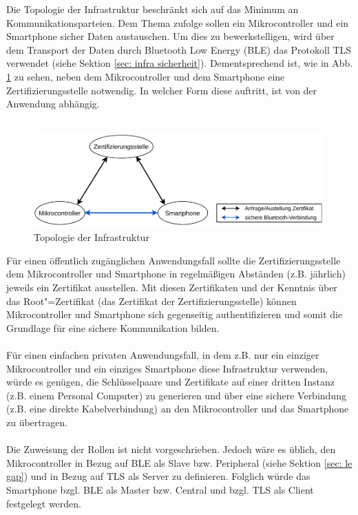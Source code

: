 Die Topologie der Infrastruktur beschränkt sich auf das Minimum an Kommunikationsparteien. Dem Thema zufolge sollen ein Mikrocontroller und ein Smartphone sicher Daten austauschen. Um dies zu bewerkstelligen, wird über dem Transport der Daten durch Bluetooth Low Energy (BLE) das Protokoll TLS verwendet (siehe Sektion \ref{sec: infra sicherheit}). Dementsprechend ist, wie in Abb. \ref{fig: infra topologie} zu sehen, neben dem Mikrocontroller und dem Smartphone eine Zertifizierungsstelle notwendig. In welcher Form diese auftritt, ist von der Anwendung abhängig.
\\\\

\begin{figure}[H]
    \centering
    \includegraphics[width=1\textwidth]{graphics/infra_topologie.pdf}
    \caption[Topologie der Infrastruktur]{Topologie der Infrastruktur}
    \label{fig: infra topologie}
\end{figure}

Für einen öffentlich zugänglichen Anwendungsfall sollte die Zertifizierungsstelle dem Mikrocontroller und Smartphone in regelmäßigen Abständen (z.B. jährlich) jeweils ein Zertifikat ausstellen. Mit diesen Zertifikaten und der Kenntnis über das Root"=Zertifikat (das Zertifikat der Zertifizierungsstelle) können Mikrocontroller und Smartphone sich gegenseitig authentifizieren und somit die Grundlage für eine sichere Kommunikation bilden.
\\\\
Für einen einfachen privaten Anwendungsfall, in dem z.B. nur ein einziger Mikrocontroller und ein einziges Smartphone diese Infrastruktur verwenden, würde es genügen, die Schlüsselpaare und Zertifikate auf einer dritten Instanz (z.B. einem Personal Computer) zu generieren und über eine sichere Verbindung (z.B. eine direkte Kabelverbindung) an den Mikrocontroller und das Smartphone zu übertragen.
\\\\
Die Zuweisung der Rollen ist nicht vorgeschrieben. Jedoch wäre es üblich, den Mikrocontroller in Bezug auf BLE als Slave bzw. Peripheral (siehe Sektion \ref{sec: le gap}) und in Bezug auf TLS als Server zu definieren. Folglich würde das Smartphone bzgl. BLE als Master bzw. Central und bzgl. TLS als Client festgelegt werden.